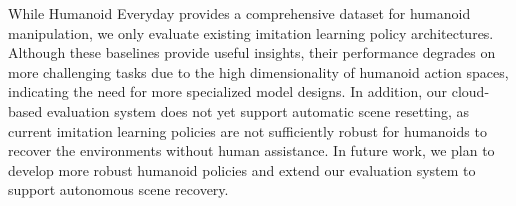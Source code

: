\documentclass[letterpaper, 10pt, conference]{ieeeconf}
\newcommand{\jiageng}[1]{\textbf{\color{cyan}[Jiageng: #1]}}
\begin{document}
While Humanoid Everyday provides a comprehensive dataset for humanoid manipulation, we only evaluate existing imitation learning policy architectures. Although these baselines provide useful insights, their performance degrades on more challenging tasks due to the high dimensionality of humanoid action spaces, indicating the need for more specialized model designs. In addition, our cloud-based evaluation system does not yet support automatic scene resetting, as current imitation learning policies are not sufficiently robust for humanoids to recover the environments without human assistance. In future work, we plan to develop more robust humanoid policies and extend our evaluation system to support autonomous scene recovery.




\end{document}
